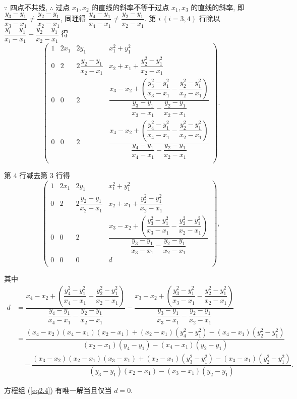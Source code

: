 \documentclass{ctexart}
\begin{document}
\begin{solution}
    $\because$ 四点不共线, $\therefore$ 过点 $x_1,x_2$ 的直线的斜率不等于过点 $x_1,x_3$ 的直线的斜率, 即 $\dfrac{y_3-y_1}{x_3-x_1}\neq\dfrac{y_2-y_1}{x_2-x_1}$, 同理得 $\dfrac{y_4-y_1}{x_4-x_1}\neq\dfrac{y_2-y_1}{x_2-x_1}$. 第 $i\ (i=3,4)$ 行除以 $\dfrac{y_i-y_1}{x_i-x_1}-\dfrac{y_2-y_1}{x_2-x_1}$ 得
    \[\begin{pmatrix}
        1 & 2x_1 & 2y_1 & x_1^2+y_1^2 \\
        0 & 2 & 2\dfrac{y_2-y_1}{x_2-x_1} & x_2+x_1+\dfrac{y_2^2-y_1^2}{x_2-x_1} \\[16pt]
        0 & 0 & 2 & \dfrac{x_3-x_2+\left(\dfrac{y_3^2-y_1^2}{x_3-x_1}-\dfrac{y_2^2-y_1^2}{x_2-x_1}\right)}{\dfrac{y_3-y_1}{x_3-x_1}-\dfrac{y_2-y_1}{x_2-x_1}} \\[16pt]
        0 & 0 & 2 & \dfrac{x_4-x_2+\left(\dfrac{y_4^2-y_1^2}{x_4-x_1}-\dfrac{y_2^2-y_1^2}{x_2-x_1}\right)}{\dfrac{y_4-y_1}{x_4-x_1}-\dfrac{y_2-y_1}{x_2-x_1}} \\[16pt]
    \end{pmatrix}.\]

    第 $4$ 行减去第 $3$ 行得
    \[\begin{pmatrix}
        1 & 2x_1 & 2y_1 & x_1^2+y_1^2 \\
        0 & 2 & 2\dfrac{y_2-y_1}{x_2-x_1} & x_2+x_1+\dfrac{y_2^2-y_1^2}{x_2-x_1} \\[8pt]
        0 & 0 & 2 & \dfrac{x_3-x_2+\left(\dfrac{y_3^2-y_1^2}{x_3-x_1}-\dfrac{y_2^2-y_1^2}{x_2-x_1}\right)}{\dfrac{y_3-y_1}{x_3-x_1}-\dfrac{y_2-y_1}{x_2-x_1}} \\[16pt]
        0 & 0 & 0 & d \\
    \end{pmatrix},\]

    其中
    \begin{align*}
        d & =\dfrac{x_4-x_2+\left(\dfrac{y_4^2-y_1^2}{x_4-x_1}-\dfrac{y_2^2-y_1^2}{x_2-x_1}\right)}{\dfrac{y_4-y_1}{x_4-x_1}-\dfrac{y_2-y_1}{x_2-x_1}}-\dfrac{x_3-x_2+\left(\dfrac{y_3^2-y_1^2}{x_3-x_1}-\dfrac{y_2^2-y_1^2}{x_2-x_1}\right)}{\dfrac{y_3-y_1}{x_3-x_1}-\dfrac{y_2-y_1}{x_2-x_1}} \\
        & =\dfrac{(x_4-x_2)(x_4-x_1)(x_2-x_1)+(x_2-x_1)(y_4^2-y_1^2)-(x_4-x_1)(y_2^2-y_1^2)}{(x_2-x_1)(y_4-y_1)-(x_4-x_1)(y_2-y_1)} \\
        & \quad-\dfrac{(x_3-x_2)(x_2-x_1)(x_3-x_1)+(x_2-x_1)(y_3^2-y_1^2)-(x_3-x_1)(y_2^2-y_1^2)}{(y_3-y_1)(x_2-x_1)-(x_3-x_1)(y_2-y_1)}.
    \end{align*}

    方程组 (\ref{eq2.4}) 有唯一解当且仅当 $d=0$.
\end{solution}
\end{document}
